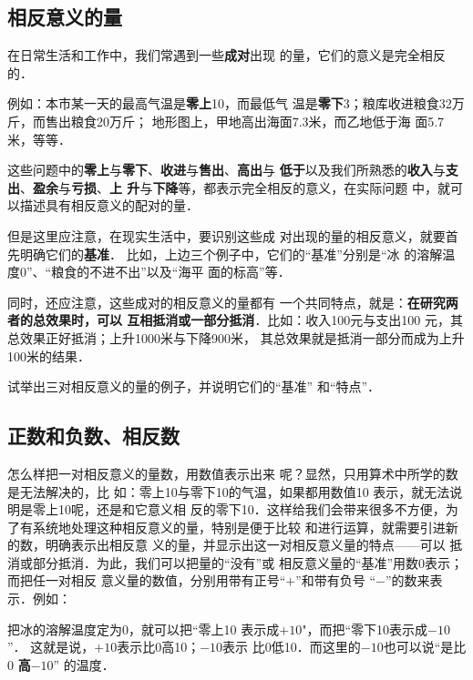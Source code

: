\subsection{相反意义的量}

在日常生活和工作中，我们常遇到一些\textbf{成对}出现
的量，它们的意义是完全相反的．

例如：本市某一天的最高气温是\textbf{零上}10\oc，而最低气
温是\textbf{零下}3\oc；粮库收进粮食32万斤，而售出粮食20万斤；
地形图上，甲地高出海面7.3米，而乙地低于海
面5.7米，等等．

    这些问题中的\textbf{零上}与\textbf{零下}、\textbf{收进}与\textbf{售出}、\textbf{高出}与
    \textbf{低于}以及我们所熟悉的\textbf{收入}与\textbf{支出}、\textbf{盈余}与\textbf{亏损}、\textbf{上
升}与\textbf{下降}等，都表示完全相反的意义，在实际问题
中，就可以描述具有相反意义的配对的量．

但是这里应注意，在现实生活中，要识别这些成
对出现的量的相反意义，就要首先明确它们的\textbf{基准}．
比如，上边三个例子中，它们的“基准”分别是“冰
的溶解温度0\oc”、“粮食的不进不出”以及“海平
面的标高”等．

    同时，还应注意，这些成对的相反意义的量都有
一个共同特点，就是：\textbf{在研究两者的总效果时，可以
互相抵消或一部分抵消}．比如：收入100元与支出100
元，其总效果正好抵消；上升1000米与下降900米，
其总效果就是抵消一部分而成为上升100米的结果．

\begin{ex}
    试举出三对相反意义的量的例子，并说明它们的“基准”
    和“特点”．
\end{ex}

\subsection{正数和负数、相反数}
    怎么样把一对相反意义的量数，用数值表示出来
呢？显然，只用算术中所学的数是无法解决的，比
如：零上10\oc 与零下10\oc 的气温，如果都用数值10
表示，就无法说明是零上10\oc 呢，还是和它意义相
反的零下10\oc．这样给我们会带来很多不方便，为
了有系统地处理这种相反意义的量，特别是便于比较
和进行运算，就需要引进新的数，明确表示出相反意
义的量，并显示出这一对相反意义量的特点——可以
抵消或部分抵消．为此，我们可以把量的“没有”或
相反意义量的“基准”用数0表示；而把任一对相反
意义量的数值，分别用带有正号“$+$”和带有负号
  “$-$”的数来表示．例如：
    
    把冰的溶解温度定为0\oc，就可以把“零上10\oc
表示成$+10$\oc"，而把“零下10\oc 表示成$-10$\oc”．
这就是说，$+ 10$\oc 表示比0\oc 高10\oc；$-10$\oc 表示
比0\oc 低10\oc ．而这里的$-10$\oc 也可以说“是比0\oc
\textbf{高}$-10$\oc” 的温度．

